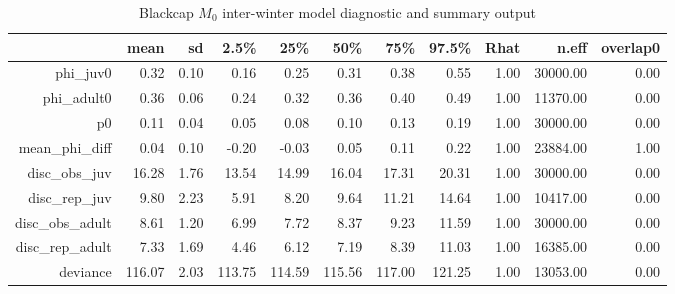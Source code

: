 \begin{table}[ht]
\centering
\begin{tabular}{rrrrrrrrrrr}
  \hline
 & mean & sd & 2.5\% & 25\% & 50\% & 75\% & 97.5\% & Rhat & n.eff & overlap0 \\ 
  \hline
phi\_juv0 & 0.32 & 0.10 & 0.16 & 0.25 & 0.31 & 0.38 & 0.55 & 1.00 & 30000.00 & 0.00 \\ 
  phi\_adult0 & 0.36 & 0.06 & 0.24 & 0.32 & 0.36 & 0.40 & 0.49 & 1.00 & 11370.00 & 0.00 \\ 
  p0 & 0.11 & 0.04 & 0.05 & 0.08 & 0.10 & 0.13 & 0.19 & 1.00 & 30000.00 & 0.00 \\ 
  mean\_phi\_diff & 0.04 & 0.10 & -0.20 & -0.03 & 0.05 & 0.11 & 0.22 & 1.00 & 23884.00 & 1.00 \\ 
  disc\_obs\_juv & 16.28 & 1.76 & 13.54 & 14.99 & 16.04 & 17.31 & 20.31 & 1.00 & 30000.00 & 0.00 \\ 
  disc\_rep\_juv & 9.80 & 2.23 & 5.91 & 8.20 & 9.64 & 11.21 & 14.64 & 1.00 & 10417.00 & 0.00 \\ 
  disc\_obs\_adult & 8.61 & 1.20 & 6.99 & 7.72 & 8.37 & 9.23 & 11.59 & 1.00 & 30000.00 & 0.00 \\ 
  disc\_rep\_adult & 7.33 & 1.69 & 4.46 & 6.12 & 7.19 & 8.39 & 11.03 & 1.00 & 16385.00 & 0.00 \\ 
  deviance & 116.07 & 2.03 & 113.75 & 114.59 & 115.56 & 117.00 & 121.25 & 1.00 & 13053.00 & 0.00 \\ 
   \hline
\end{tabular}
\caption{Blackcap $M_0$ inter-winter model diagnostic and summary output} 
\label{tab:blackcap_m0_inter_summary_output}
\end{table}
